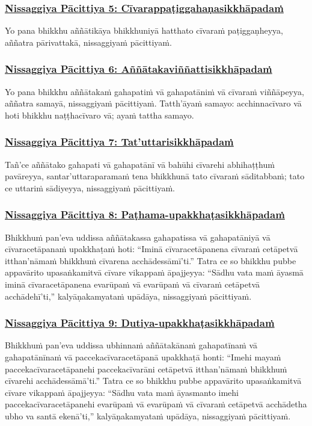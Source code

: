 \subsubsection*{\hyperref[forf-exp5]{Nissaggiya Pācittiya 5: Cīvarappaṭiggahaṇasikkhāpadaṁ}}
\label{np5}
Yo pana bhikkhu aññātikāya bhikkhuniyā hatthato cīvaraṁ paṭiggaṇheyya, aññatra pārivattakā, nissaggiyaṁ pācittiyaṁ.

\subsubsection*{\hyperref[forf-exp6]{Nissaggiya Pācittiya 6: Aññātakaviññattisikkhāpadaṁ}}
\label{np6}
Yo pana bhikkhu aññātakaṁ gahapatiṁ vā gahapatāniṁ vā cīvaraṁ viññāpeyya, aññatra samayā, nissaggiyaṁ pācittiyaṁ. Tatth'āyaṁ samayo: acchinnacīvaro vā hoti bhikkhu naṭṭhacīvaro vā; ayaṁ tattha samayo.

\subsubsection*{\hyperref[forf-exp7]{Nissaggiya Pācittiya 7: Tat'uttarisikkhāpadaṁ}}
\label{np7}
Tañ'ce aññātako gahapati vā gahapatānī vā bahūhi cīvarehi abhihaṭṭhuṁ pavāreyya, santar'uttaraparamaṁ tena bhikkhunā tato cīvaraṁ sāditabbaṁ; tato ce uttariṁ sādiyeyya, nissaggiyaṁ pācittiyaṁ.

\subsubsection*{\hyperref[forf-exp8]{Nissaggiya Pācittiya 8: Paṭhama-upakkhaṭasikkhāpadaṁ}}
\label{np8}
Bhikkhuṁ pan'eva uddissa aññātakassa gahapatissa vā gahapatāniyā vā cīvaracetāpanaṁ upakkhaṭaṁ hoti: ``Iminā cīvaracetāpanena cīvaraṁ cetāpetvā itthan'nāmaṁ bhikkhuṁ cīvarena acchādessāmī'ti.'' Tatra ce so bhikkhu pubbe appavārito upasaṅkamitvā cīvare vikappaṁ āpajjeyya: ``Sādhu vata maṁ āyasmā iminā cīvaracetāpanena evarūpaṁ vā evarūpaṁ vā cīvaraṁ cetāpetvā acchādehī'ti,'' kalyāṇakamyataṁ upādāya, nissaggiyaṁ pācittiyaṁ.

\subsubsection*{\hyperref[forf-exp9]{Nissaggiya Pācittiya 9: Dutiya-upakkhaṭasikkhāpadaṁ}}
\label{np9}
Bhikkhuṁ pan'eva uddissa ubhinnaṁ aññātakānaṁ gahapatīnaṁ vā gahapatānīnaṁ vā paccekacīvaracetāpanā upakkhaṭā honti: ``Imehi mayaṁ paccekacīvaracetāpanehi paccekacīvarāni cetāpetvā itthan'nāmaṁ bhikkhuṁ cīvarehi acchādessāmā'ti.'' Tatra ce so bhikkhu pubbe appavārito upasaṅkamitvā cīvare vikappaṁ āpajjeyya: ``Sādhu vata maṁ āyasmanto imehi paccekacīvaracetāpanehi evarūpaṁ vā evarūpaṁ vā cīvaraṁ cetāpetvā acchādetha ubho va santā ekenā'ti,'' kalyāṇakamyataṁ upādāya, nissaggiyaṁ pācittiyaṁ.


